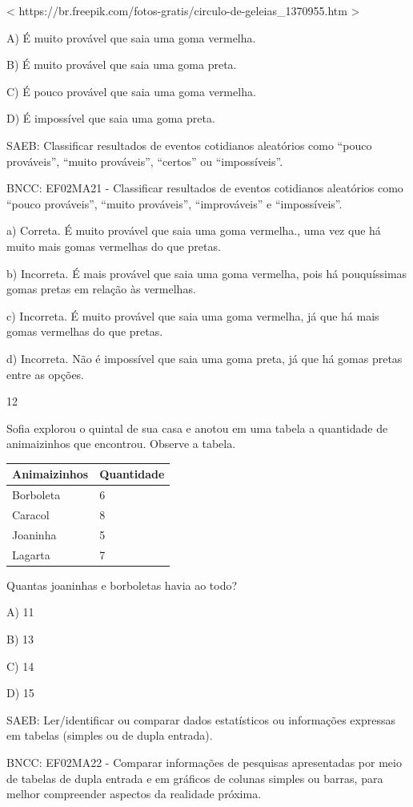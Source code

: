 \begin{escolha}
\begin{escolha}
{{{{\textless{}
https://br.freepik.com/fotos-gratis/circulo-de-geleias\_1370955.htm
\textgreater{}

A) É muito provável que saia uma goma vermelha.

B) É muito provável que saia uma goma preta.

C) É pouco provável que saia uma goma vermelha.

D) É impossível que saia uma goma preta.

SAEB: Classificar resultados de eventos cotidianos aleatórios
como ``pouco prováveis'', ``muito prováveis'', ``certos'' ou
``impossíveis''.

BNCC: EF02MA21 - Classificar resultados de eventos cotidianos aleatórios
como ``pouco prováveis'', ``muito prováveis'', ``improváveis'' e
``impossíveis''.

a) Correta. É muito provável que saia uma goma vermelha., uma vez que há
muito mais gomas vermelhas do que pretas.

b) Incorreta. É mais provável que saia uma goma vermelha, pois há
pouquíssimas gomas pretas em relação às vermelhas.

c) Incorreta. É muito provável que saia uma goma vermelha, já que há
mais gomas vermelhas do que pretas.

d) Incorreta. Não é impossível que saia uma goma preta, já que há gomas
pretas entre as opções.

\num{12}

Sofia explorou o quintal de sua casa e anotou em uma tabela a quantidade
de animaizinhos que encontrou. Observe a tabela.

\begin{longtable}[]{@{}ll@{}}
\toprule
Animaizinhos & Quantidade\tabularnewline
\midrule
\endhead
Borboleta & 6\tabularnewline
Caracol & 8\tabularnewline
Joaninha & 5\tabularnewline
Lagarta & 7\tabularnewline
\bottomrule
\end{longtable}

Quantas joaninhas e borboletas havia ao todo?

A) 11

B) 13

C) 14

D) 15

SAEB: Ler/identificar ou comparar dados estatísticos ou
informações expressas em tabelas (simples ou de dupla entrada).

BNCC: EF02MA22 - Comparar informações de pesquisas apresentadas por meio
de tabelas de dupla entrada e em gráficos de colunas simples ou barras,
para melhor compreender aspectos da realidade próxima.

}}}}
\end{escolha}
\end{escolha}
